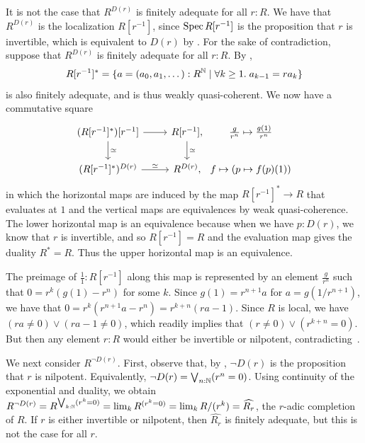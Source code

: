 \begin{counterexample}\label{cex:exp-Dr-not-fin-adeq}
  It is not the case that $R^{D(r)}$ is finitely adequate for all $r : R$.
  We have that $R^{D(r)}$ is the localization $R[r^{-1}]$, since $\operatorname{Spec} R[r^{-1}]$
  is the proposition that $r$ is invertible, which is equivalent to $D(r)$
  by \cite[Proposition 2.2.3]{draft}.
  For the sake of contradiction, suppose that $R^{D(r)}$ is finitely adequate for all $r : R$.
  By ,
  \[
    R[r^{-1}]^\ast = \{ a=(a_0,a_1,\dots) : R^{\mathbb{N}} \;|\; \forall k \geq 1.\; a_{k-1} = ra_k \}
  \]
  is also finitely adequate, and is thus weakly quasi-coherent.
  We now have a commutative square
  \[
  \begin{tikzcd}
    (R[r^{-1}]^\ast)[r^{-1}] \ar[d, "\simeq"]\ar[r] & R[r^{-1}], \ar[d, "\simeq"] &[-25pt] \frac{g}{r^n} \mapsto \frac{g(1)}{r^n} \\
    (R[r^{-1}]^\ast)^{D(r)} \ar[r, "\simeq"] & R^{D(r)}, & f \mapsto (p \mapsto f(p)(1))
  \end{tikzcd}
  \]
  in which the horizontal maps are induced by the map $R[r^{-1}]^{\ast} \to R$ that evaluates at $1$
  and the vertical maps are equivalences by weak quasi-coherence.
  The lower horizontal map is an equivalence because when we have $p : D(r)$,
  we know that $r$ is invertible, and so $R[r^{-1}] = R$ and the evaluation
  map gives the duality $R^\ast = R$.
  Thus the upper horizontal map is an equivalence.

  The preimage of $\frac{1}{1}:R[r^{-1}]$ along this map is represented by an element $\frac{g}{r^n}$ such that $0=r^k(g(1)-r^n)$ for some $k$.
  Since $g(1) = r^{n+1} a$ for $a = g(1/r^{n+1})$, we have that
  $0=r^k(r^{n+1}a-r^n)=r^{k+n}(ra-1)$.
  Since $R$ is local, we have $(ra \neq 0) \lor (ra-1 \neq 0)$, which readily implies that $(r \neq 0) \lor (r^{k+n} = 0)$.
  But then any element $r:R$ would either be invertible or nilpotent, contradicting~\cite[Corollary~1.2.4]{topology-draft}.
\end{counterexample}

We next consider $R^{\lnot D(r)}$.
First, observe that, by \cite[Proposition 2.2.3]{draft}, $\lnot D(r)$ is the proposition that $r$ is nilpotent.
Equivalently, $\lnot D(r) = \bigvee_{n : \mathbb{N}} (r^n = 0)$.
Using continuity of the exponential and duality, we obtain $R^{\lnot D(r)} = R^{\bigvee_{k : \mathbb{N}}(r^k = 0)} = \lim_k R^{(r^k = 0)} = \lim_k R/(r^k) = \widehat{R_r}$,
the $r$-adic completion of $R$.
If $r$ is either invertible or nilpotent, then $\widehat{R_r}$ is finitely adequate,
but this is not the case for all $r$.

